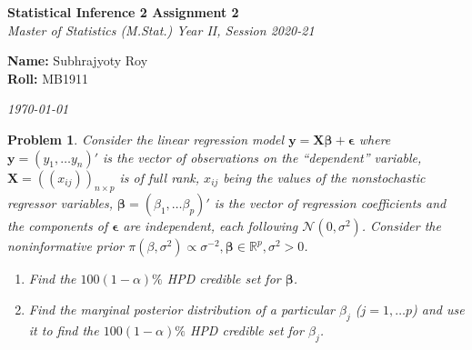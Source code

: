 \documentclass[12pt]{article}
\theoremstyle{problemstyle}
\newtheorem{pbm}{Problem}
\newenvironment{problem}{
\begin{tcolorbox}[colback=green!10!white,colframe=black!75!black, parbox = false]\begin{pbm} }{\end{pbm}\end{tcolorbox} }
\newcommand{\normal}{\mathcal{N}}
\newcommand{\R}{\mathbb{R}}
\newcommand{\bb}[1]{\boldsymbol{#1}}
\begin{document}
\begin{titlepage}
    \begin{center}
        \vspace*{3cm}
        \Huge{\textbf{Statistical Inference 2 Assignment 2}}\\
        \vspace*{1cm}
        \large{\textit{Master of Statistics (M.Stat.) Year II, Session 2020-21}}\\
        \vspace*{5cm}
        \begin{tcolorbox}[colback=black!5!white,colframe=black!75!black, width = 0.5\linewidth]
            \vspace*{0.5cm}
            \textbf{Name: } Subhrajyoty Roy\\
            \textbf{Roll: } MB1911
            \vspace*{0.5cm}
        \end{tcolorbox}
    \end{center}
    \vspace*{3cm}
    \begin{flushright}
        \large\textit{\today}
    \end{flushright}
\end{titlepage}

\begin{problem}
    Consider the linear regression model $\bb{y} = \bb{X}\bb{\beta} + \bb{\epsilon}$ where $\bb{y} = (y_1, \dots y_n)'$ is the vector of observations on the ``dependent'' variable, $\bb{X} = ((x_{ij}))_{n\times p}$ is of full rank, $x_{ij}$ being the values of the nonstochastic regressor variables, $\bb{\beta} = (\beta_1, \dots \beta_p)'$ is the vector of regression coefficients and the components of $\bb{\epsilon}$ are independent, each following $\normal(0, \sigma^2)$. Consider the noninformative prior $\pi(\beta, \sigma^2) \propto \sigma^{-2}, \bb{\beta} \in \R^p, \sigma^2 > 0$.
    \begin{enumerate}
        \item[(a)] Find the $100(1-\alpha)\%$ HPD credible set for $\bb{\beta}$.
        \item[(b)] Find the marginal posterior distribution of a particular $\beta_j$ ($j = 1, \dots p$) and use it to find the $100(1 -\alpha)\%$ HPD credible set for $\beta_{j}$. 
    \end{enumerate}
\end{problem}
\end{document}
